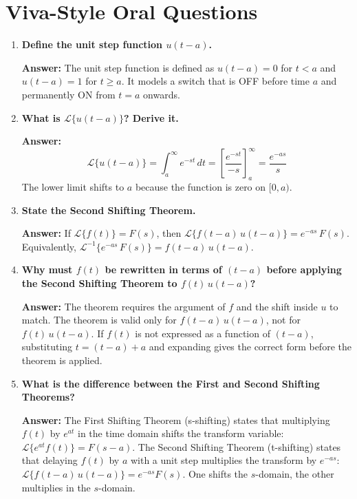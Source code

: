 \documentclass[12pt,a4paper]{article}
\begin{document}
\section{Viva-Style Oral Questions}

\begin{enumerate}[label=\textbf{Q\arabic*.}]

\item \textbf{Define the unit step function $u(t-a)$.}

  \textbf{Answer:}
  The unit step function is defined as
  $u(t-a) = 0$ for $t < a$ and $u(t-a) = 1$ for $t \geq a$.
  It models a switch that is OFF before time $a$ and permanently ON from $t = a$ onwards.

\item \textbf{What is $\mathcal{L}\{u(t-a)\}$? Derive it.}

  \textbf{Answer:}
  \[
    \mathcal{L}\{u(t-a)\} = \int_a^{\infty} e^{-st}\,dt
    = \left[\frac{e^{-st}}{-s}\right]_a^{\infty} = \frac{e^{-as}}{s}
  \]
  The lower limit shifts to $a$ because the function is zero on $[0, a)$.

\item \textbf{State the Second Shifting Theorem.}

  \textbf{Answer:}
  If $\mathcal{L}\{f(t)\} = F(s)$, then
  $\mathcal{L}\{f(t-a)\,u(t-a)\} = e^{-as}\,F(s)$.
  Equivalently, $\mathcal{L}^{-1}\{e^{-as}\,F(s)\} = f(t-a)\,u(t-a)$.

\item \textbf{Why must $f(t)$ be rewritten in terms of $(t-a)$ before applying the
  Second Shifting Theorem to $f(t)\,u(t-a)$?}

  \textbf{Answer:}
  The theorem requires the argument of $f$ and the shift inside $u$ to match.
  The theorem is valid only for $f(t-a)\,u(t-a)$, not for $f(t)\,u(t-a)$.
  If $f(t)$ is not expressed as a function of $(t-a)$, substituting $t = (t-a)+a$
  and expanding gives the correct form before the theorem is applied.

\item \textbf{What is the difference between the First and Second Shifting Theorems?}

  \textbf{Answer:}
  The First Shifting Theorem (s-shifting) states that multiplying $f(t)$ by $e^{at}$
  in the time domain shifts the transform variable: $\mathcal{L}\{e^{at}f(t)\} = F(s-a)$.
  The Second Shifting Theorem (t-shifting) states that delaying $f(t)$ by $a$ with a unit
  step multiplies the transform by $e^{-as}$:
  $\mathcal{L}\{f(t-a)\,u(t-a)\} = e^{-as}F(s)$.
  One shifts the $s$-domain, the other multiplies in the $s$-domain.


\end{enumerate}
\end{document}
